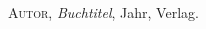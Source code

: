 


\begin{thebibliography}{99}

 \textsc {Autor,}  \emph{Buchtitel}, Jahr, Verlag.
 
\end{thebibliography}
